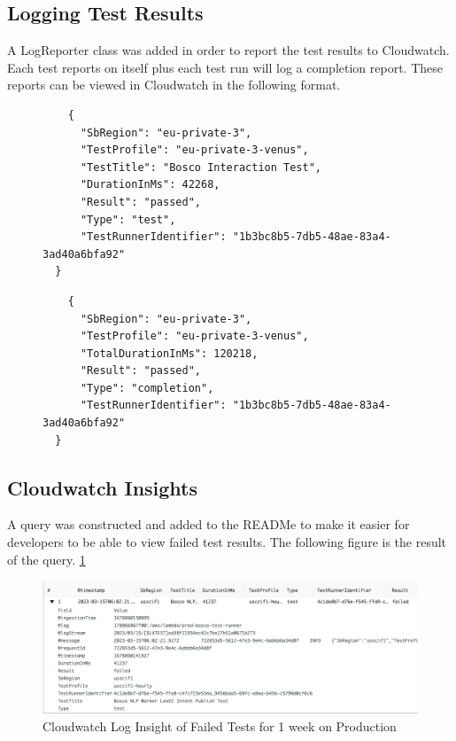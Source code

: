 \documentclass[12pt,a4paper,titlepage]{report}
\begin{document}
\subsection{Logging Test Results}
A LogReporter class was added in order to report the test results to Cloudwatch. Each test reports on itself plus each test run will log a completion report. 
These reports can be viewed in Cloudwatch in the following format.

\begin{figure}[H]
  \begin{tcolorbox}
   \begin{verbatim}
    {
      "SbRegion": "eu-private-3",
      "TestProfile": "eu-private-3-venus",
      "TestTitle": "Bosco Interaction Test",
      "DurationInMs": 42268,
      "Result": "passed",
      "Type": "test",
      "TestRunnerIdentifier": "1b3bc8b5-7db5-48ae-83a4-3ad40a6bfa92"
  }
 \end{verbatim}
 \end{tcolorbox}
 \end{figure}

 \begin{figure}[H]
  \begin{tcolorbox}
   \begin{verbatim}
    {
      "SbRegion": "eu-private-3",
      "TestProfile": "eu-private-3-venus",
      "TotalDurationInMs": 120218,
      "Result": "passed",
      "Type": "completion",
      "TestRunnerIdentifier": "1b3bc8b5-7db5-48ae-83a4-3ad40a6bfa92"
  }
 \end{verbatim}
 \end{tcolorbox}
 \end{figure}

 \subsection{Cloudwatch Insights}
 A query was constructed and added to the READMe to make it easier for developers to be able to view failed test results.
 The following figure is the result of the query. \ref{fig:insight}
 \begin{figure}[H]
  \centering
  \includegraphics[width=\textwidth,height=\textheight,keepaspectratio]{./diagrams/insights.png}
  \caption{Cloudwatch Log Insight of Failed Tests for 1 week on Production}
  \label{fig:insight}
 \end{figure}
\end{document}
